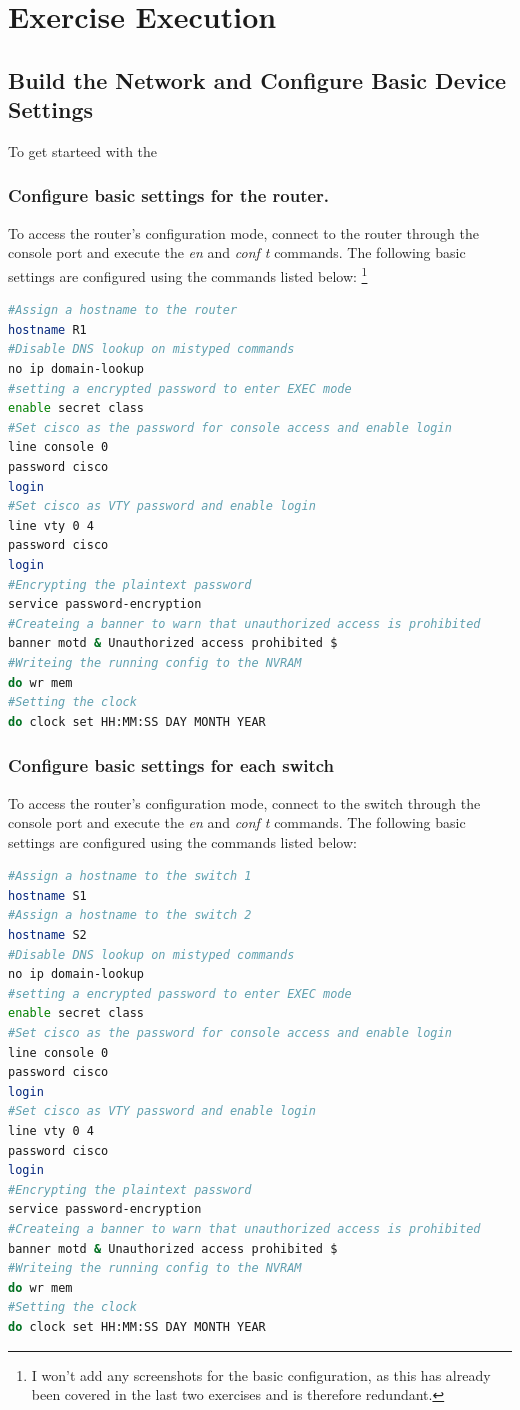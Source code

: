 \documentclass[a4paper]{article}
\newcommand{\abc}{\hfill \break}
\newcommand{\ii}{\textit}
\begin{document}
\newpage

\section{Exercise Execution}
\subsection{Build the Network and Configure Basic Device Settings}
To get starteed with the 
\subsubsection{Configure basic settings for the router.}
To access the router's configuration mode, connect to the router through the console port and execute the \ii{en} and \ii{conf t} commands.\abc
The following basic settings are configured using the commands listed below: \footnote{I won't add any screenshots for the basic configuration, as this has already been covered in the last two exercises and is therefore redundant.}
\begin{lstlisting}[language=bash]
#Assign a hostname to the router
hostname R1
#Disable DNS lookup on mistyped commands
no ip domain-lookup
#setting a encrypted password to enter EXEC mode
enable secret class
#Set cisco as the password for console access and enable login
line console 0
password cisco
login
#Set cisco as VTY password and enable login
line vty 0 4
password cisco
login
#Encrypting the plaintext password
service password-encryption
#Createing a banner to warn that unauthorized access is prohibited
banner motd & Unauthorized access prohibited $
#Writeing the running config to the NVRAM
do wr mem
#Setting the clock
do clock set HH:MM:SS DAY MONTH YEAR
\end{lstlisting}

\subsubsection{Configure basic settings for each switch}
To access the router's configuration mode, connect to the switch through the console port and execute the \ii{en} and \ii{conf t} commands.\abc
The following basic settings are configured using the commands listed below:
\begin{lstlisting}[language=bash]
#Assign a hostname to the switch 1
hostname S1
#Assign a hostname to the switch 2
hostname S2
#Disable DNS lookup on mistyped commands
no ip domain-lookup
#setting a encrypted password to enter EXEC mode
enable secret class
#Set cisco as the password for console access and enable login
line console 0
password cisco
login
#Set cisco as VTY password and enable login
line vty 0 4
password cisco
login
#Encrypting the plaintext password
service password-encryption
#Createing a banner to warn that unauthorized access is prohibited
banner motd & Unauthorized access prohibited $
#Writeing the running config to the NVRAM
do wr mem
#Setting the clock
do clock set HH:MM:SS DAY MONTH YEAR
\end{lstlisting}
\end{document}

